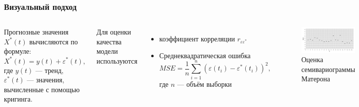 \documentclass[10pt,pdf,aspectratio=169,hyperref={unicode}]{beamer}
\begin{document}
\begin{frame}
  \frametitle{Визуальный подход}
  \begin{columns}[c]
  \column{2.5in}
    Прогнозные значения $ X^{*}(t) $ вычисляются по формуле:
    \begin{equation*}
      X^{*}(t) = y(t) + \varepsilon^{*}(t),
    \end{equation*}
    где $ y(t) $ --- тренд, $ \varepsilon^{*}(t) $ --- значения, вычисленные с помощью кригинга.

    \vspace{0.5em}

    Для оценки качества модели используются
    \begin{itemize}
      \item коэффициент корреляции $ r_{\varepsilon\varepsilon^{*}} $
      \item Среднеквадратическая ошибка
        \begin{equation}
        \label{eq:mse}
          MSE = \frac{1}{n} \sum_{i=1}^{n} (\varepsilon(t_i) - \varepsilon^{*}(t_i))^2,
        \end{equation}
        где $ n $ --- объём выборки
    \end{itemize}

  \column{3.5in}
    \begin{figure}[h]
    \includegraphics[width=1\linewidth]{../../figures/variogram/lin-variogram.png}
    \caption{Оценка семивариограммы Матерона}
  \end{figure}
  \end{columns}
\end{frame}
\end{document}
